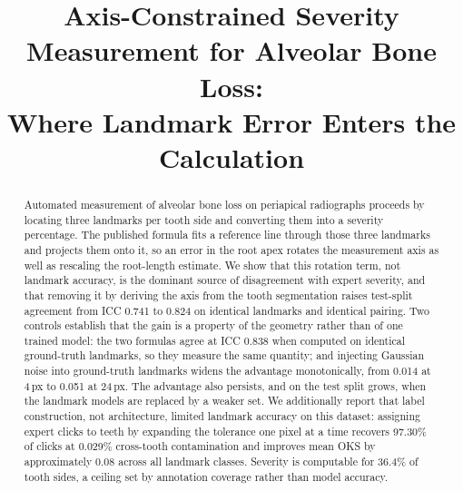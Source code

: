 \documentclass[conference]{IEEEtran}
\begin{document}
\title{Axis-Constrained Severity Measurement for Alveolar Bone Loss:\\ Where Landmark Error Enters the Calculation}

\author{
\and
{}
\and
{}
}

\maketitle

\begin{abstract}
Automated measurement of alveolar bone loss on periapical radiographs proceeds by locating three landmarks per tooth side and converting them into a severity percentage. The published formula fits a reference line through those three landmarks and projects them onto it, so an error in the root apex rotates the measurement axis as well as rescaling the root-length estimate. We show that this rotation term, not landmark accuracy, is the dominant source of disagreement with expert severity, and that removing it by deriving the axis from the tooth segmentation raises test-split agreement from ICC 0.741 to 0.824 on identical landmarks and identical pairing. Two controls establish that the gain is a property of the geometry rather than of one trained model: the two formulas agree at ICC 0.838 when computed on identical ground-truth landmarks, so they measure the same quantity; and injecting Gaussian noise into ground-truth landmarks widens the advantage monotonically, from 0.014 at 4\,px to 0.051 at 24\,px. The advantage also persists, and on the test split grows, when the landmark models are replaced by a weaker set. We additionally report that label construction, not architecture, limited landmark accuracy on this dataset: assigning expert clicks to teeth by expanding the tolerance one pixel at a time recovers 97.30\% of clicks at 0.029\% cross-tooth contamination and improves mean OKS by approximately 0.08 across all landmark classes. Severity is computable for 36.4\% of tooth sides, a ceiling set by annotation coverage rather than model accuracy.
\end{abstract}
\end{document}
